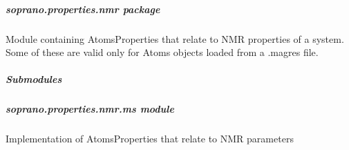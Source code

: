 \documentclass[letterpaper,10pt,english]{sphinxmanual}
\begin{document}
\subparagraph{soprano.properties.nmr package}
\label{doctree/soprano.properties.nmr:module-soprano.properties.nmr}\label{doctree/soprano.properties.nmr::doc}\label{doctree/soprano.properties.nmr:soprano-properties-nmr-package}
Module containing AtomsProperties that relate to NMR properties of a system.
Some of these are valid only for Atoms objects loaded from a .magres file.


\subparagraph{Submodules}
\label{doctree/soprano.properties.nmr:submodules}

\subparagraph{soprano.properties.nmr.ms module}
\label{doctree/soprano.properties.nmr.ms:soprano-properties-nmr-ms-module}\label{doctree/soprano.properties.nmr.ms::doc}\label{doctree/soprano.properties.nmr.ms:module-soprano.properties.nmr.ms}
Implementation of AtomsProperties that relate to NMR parameters
\end{document}
